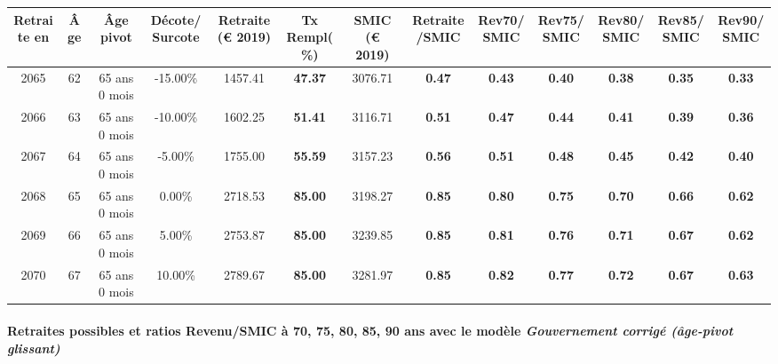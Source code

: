 { \scriptsize \begin{center} 
\begin{tabular}[htb]{|c|c||c|c||c|c||c||c|c|c|c|c|c|} 
\hline 
 Retraite en &  Âge &  Âge pivot &  Décote/Surcote &  Retraite (\euro{} 2019) &  Tx Rempl(\%) &  SMIC (\euro{} 2019) &  Retraite/SMIC &  Rev70/SMIC &  Rev75/SMIC &  Rev80/SMIC &  Rev85/SMIC &  Rev90/SMIC \\ 
\hline \hline 
 2065 &  62 &  65 ans 0 mois &  -15.00\% &  1457.41 &  {\bf 47.37} &  3076.71 &  {\bf {\color{red} 0.47}} &  {\bf {\color{red} 0.43}} &  {\bf {\color{red} 0.40}} &  {\bf {\color{red} 0.38}} &  {\bf {\color{red} 0.35}} &  {\bf {\color{red} 0.33}} \\ 
\hline 
 2066 &  63 &  65 ans 0 mois &  -10.00\% &  1602.25 &  {\bf 51.41} &  3116.71 &  {\bf {\color{red} 0.51}} &  {\bf {\color{red} 0.47}} &  {\bf {\color{red} 0.44}} &  {\bf {\color{red} 0.41}} &  {\bf {\color{red} 0.39}} &  {\bf {\color{red} 0.36}} \\ 
\hline 
 2067 &  64 &  65 ans 0 mois &  -5.00\% &  1755.00 &  {\bf 55.59} &  3157.23 &  {\bf {\color{red} 0.56}} &  {\bf {\color{red} 0.51}} &  {\bf {\color{red} 0.48}} &  {\bf {\color{red} 0.45}} &  {\bf {\color{red} 0.42}} &  {\bf {\color{red} 0.40}} \\ 
\hline 
 2068 &  65 &  65 ans 0 mois &  0.00\% &  2718.53 &  {\bf 85.00} &  3198.27 &  {\bf {\color{red} 0.85}} &  {\bf {\color{red} 0.80}} &  {\bf {\color{red} 0.75}} &  {\bf {\color{red} 0.70}} &  {\bf {\color{red} 0.66}} &  {\bf {\color{red} 0.62}} \\ 
\hline 
 2069 &  66 &  65 ans 0 mois &  5.00\% &  2753.87 &  {\bf 85.00} &  3239.85 &  {\bf {\color{red} 0.85}} &  {\bf {\color{red} 0.81}} &  {\bf {\color{red} 0.76}} &  {\bf {\color{red} 0.71}} &  {\bf {\color{red} 0.67}} &  {\bf {\color{red} 0.62}} \\ 
\hline 
 2070 &  67 &  65 ans 0 mois &  10.00\% &  2789.67 &  {\bf 85.00} &  3281.97 &  {\bf {\color{red} 0.85}} &  {\bf {\color{red} 0.82}} &  {\bf {\color{red} 0.77}} &  {\bf {\color{red} 0.72}} &  {\bf {\color{red} 0.67}} &  {\bf {\color{red} 0.63}} \\ 
\hline 
\hline 
\end{tabular} 
\end{center} } 
\paragraph{Retraites possibles et ratios Revenu/SMIC à 70, 75, 80, 85, 90 ans avec le modèle \emph{Gouvernement corrigé (âge-pivot glissant)}}  
 
